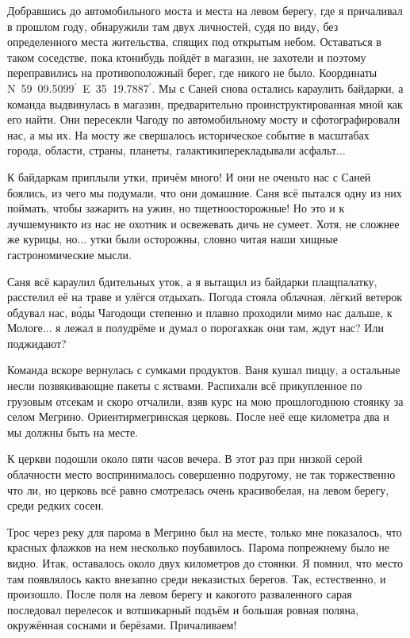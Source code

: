 Добравшись до автомобильного моста и места на левом берегу, где я причаливал в прошлом году, обнаружили там двух личностей, судя по виду, без определенного места жительства, спящих под открытым небом. Оставаться в таком соседстве, пока кто\sdash нибудь пойдёт в магазин, не захотели и поэтому переправились на противоположный берег, где никого не было. Координаты N~59\degree~09.5099$^\prime$~E~35\degree~19.7887$^\prime$. Мы с Саней снова остались караулить байдарки, а команда выдвинулась в магазин, предварительно проинструктированная мной как его найти. Они пересекли Чагоду по автомобильному мосту и сфотографировали нас, а мы их. На мосту же свершалось историческое событие в масштабах города, области, страны, планеты, галактики\mdash  перекладывали асфальт$\ldots$ 

К байдаркам приплыли утки, причём много! И они не очень\sdash то нас с Саней боялись, из чего мы подумали, что они домашние. Саня всё пытался одну из них поймать, чтобы зажарить на ужин, но тщетно\mdash осторожные! Но это и к лучшему\mdash никто из нас не охотник и освежевать дичь не сумеет. Хотя, не сложнее же курицы, но$\ldots$ утки были осторожны, словно читая наши хищные гастрономические мысли.

Саня всё караулил бдительных уток, а я вытащил из байдарки плащ\sdash палатку, расстелил её на траве и улёгся отдыхать. Погода стояла облачная, лёгкий ветерок обдувал нас, в\'{о}ды Чагодощи степенно и плавно проходили мимо нас дальше, к Мологе$\ldots$ я лежал в полудрёме и думал о порогах\mdash как они там, ждут нас? Или поджидают?

Команда вскоре вернулась с сумками продуктов. Ваня кушал пиццу, а остальные несли позвякивающие пакеты с яствами. Распихали всё прикупленное по грузовым отсекам и скоро отчалили, взяв курс на мою прошлогоднюю стоянку за селом Мегрино. Ориентир\mdash мегринская церковь. После неё еще километра два и мы должны быть на месте.

К церкви подошли около пяти часов вечера. В этот раз при низкой серой облачности место воспринималось совершенно по\sdash другому, не так торжественно что ли, но церковь всё равно смотрелась очень красиво\mdash белая, на левом берегу, среди редких сосен.
 
Трос через реку для парома в Мегрино был на месте, только мне показалось, что красных флажков на нем несколько поубавилось. Парома по\sdash прежнему было не видно. Итак, оставалось около двух километров до стоянки. Я помнил, что место там появлялось как\sdash то внезапно среди неказистых берегов. Так, естественно, и произошло. После поля на левом берегу и какого\sdash то разваленного сарая последовал перелесок и вот\mdash шикарный подъём и большая ровная поляна, окружённая соснами и берёзами. Причаливаем! 

